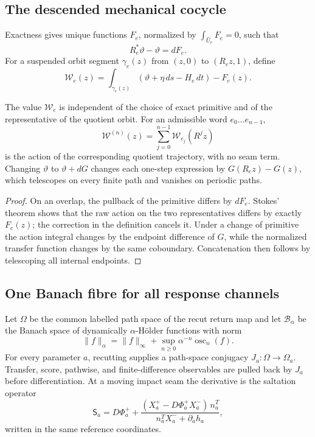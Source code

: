\subsection{The descended mechanical cocycle}

Exactness gives unique functions \(F_e\), normalized by
\(\int_{\widehat U_e}F_e=0\), such that
\[
 R_e^*\vartheta-\vartheta=dF_e.
\]
For a suspended orbit segment \(\gamma_e(z)\) from \((z,0)\) to
\((R_ez,1)\), define
\[
 {\mathcal W}_e(z)
 =\int_{\gamma_e(z)}(\vartheta+\eta\,ds-H_e\,dt)-F_e(z).
\]

\begin{proposition}
\label{prop:r5-a1-work}
The value \({\mathcal W}_e\) is independent of the choice of exact primitive
and of the representative of the quotient orbit.  For an admissible word
\(e_0\ldots e_{n-1}\),
\[
 {\mathcal W}^{(n)}(z)
 =\sum_{j=0}^{n-1}{\mathcal W}_{e_j}(R^jz)
\]
is the action of the corresponding quotient trajectory, with no seam term.
Changing \(\vartheta\) to \(\vartheta+dG\) changes each one-step expression
by \(G(R_ez)-G(z)\), which telescopes on every finite path and vanishes on
periodic paths.
\end{proposition}

\begin{proof}
On an overlap, the pullback of the primitive differs by
\(dF_e\).  Stokes' theorem shows that the raw action on the two
representatives differs by exactly \(F_e(z)\); the correction in the
definition cancels it.  Under a change of primitive the action integral
changes by the endpoint difference of \(G\), while the normalized transfer
function changes by the same coboundary.  Concatenation then follows by
telescoping all internal endpoints.
\end{proof}

\subsection{One Banach fibre for all response channels}

Let \(\Omega\) be the common labelled path space of the recut return map and
let \(\mathscr B_\alpha\) be the Banach space of dynamically
\(\alpha\)-H\"older functions with norm
\[
 \|f\|_\alpha=\|f\|_\infty+
 \sup_{n\ge0}\alpha^{-n}\operatorname{osc}_n(f).
\]
For every parameter \(a\), recutting supplies a path-space conjugacy
\(J_a:\Omega\to\Omega_a\).  Transfer, score, pathwise, and finite-difference
observables are pulled back by \(J_a\) before differentiation.  At a moving
impact seam the derivative is the saltation operator
\[
 {\mathsf S}_a
 =D\Phi_a^+
 +\frac{(X_a^+-D\Phi_a^+X_a^-)\,n_a^T}
        {n_a^TX_a^-+\partial_a h_a},
\]
written in the same reference coordinates.

